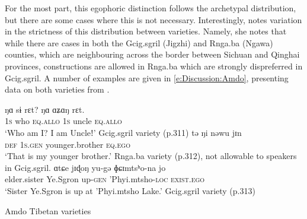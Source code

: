 For the most part, this egophoric distinction follows the archetypal distribution, but there are some cases where this is not necessary. Interestingly,  notes variation in the strictness of this distribution between varieties. Namely, she notes that while there are cases in both the Gcig.sgril (Jigzhi) and Rnga.ba (Ngawa) counties, which are neighbouring across the border between Sichuan and Qinghai provinces, constructions are allowed in Rnga.ba which are strongly dispreferred in Gcig.sgril. A number of examples are given in \ref{e:Discussion:Amdo}, presenting data on both varieties from .

\begin{exe}
    \ex\label{e:Discussion:Amdo}
    \begin{xlist}
        \ex \label{e:Discussion:Amdo:A}
        \gll ŋɑ sɨ rɛt? ŋɑ ɑʑɑŋ rɛt. \\
        \textsc{1s} who \textsc{eq.allo} \textsc{1s} uncle \textsc{eq.allo} \\
        \glt `Who am I? I am Uncleǃ' Gcig.sgril variety (p.311)
        \ex \label{e:Discussion:Amdo:B}
        \gll tə ŋi nəwu jɪn \\
        \textsc{def} \textsc{1s.gen} younger.brother \textsc{eq.ego} \\
        \glt `That is my younger brother.' Rnga.ba variety (p.312), not allowable to speakers in Gcig.sgril.
        \ex \label{e:Discussion:Amdo:C}
        \gll ɑtɕe jɪɖoŋ yu-gə ɸɕɪmtsʰo-na jo \\
        elder.sister Ye.Sgron up-\textsc{gen} 'Phyi.mtsho-\textsc{loc} \textsc{exist.ego} \\
        `Sister Ye.Sgron is up at 'Phyi.mtsho Lake.' Gcig.sgril variety (p.313)
    \end{xlist}
    Amdo Tibetan varieties \cite[Tibetic: PRC,][311-313]{Tribur2019}
\end{exe}

